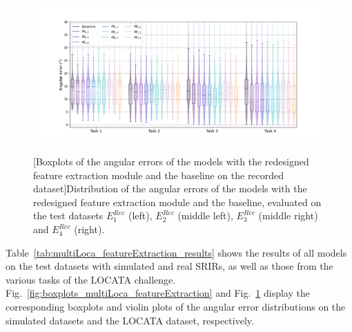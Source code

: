 \begin{figure}[t]
    \centering
    \begin{adjustbox}{width=1.3\textwidth,center}
        \includegraphics[width=1.\textwidth]{Images/chap7/boxplots_featureExtraction_locata.png}
    \end{adjustbox}
    
    [Boxplots of the angular errors of the models with the redesigned feature extraction module and the baseline on the recorded dataset]{Distribution of the angular errors of the models with the redesigned feature extraction module and the baseline, evaluated on the test datasets $E^{Rec}_1$ (left), $E^{Rec}_2$ (middle left), $E^{Rec}_3$ (middle right) and $E^{Rec}_4$ (right).}
    \label{fig:boxplots_multiLoca_featureExtraction_locata}
\end{figure}


Table~\ref{tab:multiLoca_featureExtraction_results} shows the results of all models on the test datasets with simulated and real SRIRs, as well as those from the various tasks of the LOCATA challenge. Fig.~\ref{fig:boxplots_multiLoca_featureExtraction} and Fig.~\ref{fig:boxplots_multiLoca_featureExtraction_locata} display the corresponding boxplots and violin plots of the angular error distributions on the simulated datasets and the LOCATA dataset, respectively.

